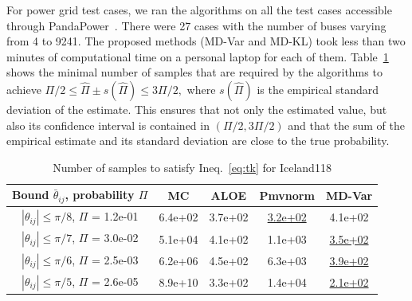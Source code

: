 For power grid test cases, we ran the algorithms on all the test cases accessible through PandaPower~\cite{pandapower.2018}. There were 27 cases with the number of buses varying from 4 to 9241. The proposed methods (MD-Var and MD-KL) took less than two minutes of computational time on a personal laptop for each of them. 
%
Table~\ref{tab:sample-compX} shows the minimal number of samples that are required by the algorithms to achieve $\Pi/2 \le \hat\Pi \pm s(\hat\Pi) \le 3\Pi/2, \label{eq:tk}$
where $s(\hat\Pi)$ is the empirical standard deviation of the estimate. This ensures that not only the estimated value, but also its confidence interval is contained in $(\Pi/2, 3\Pi/2)$ and that the sum of the empirical estimate and its standard deviation are close to %
the true probability. 


\begin{table}[ht]
\centering
\captionsetup{justification=centering}
\caption{Number of samples to satisfy Ineq.~\eqref{eq:tk} 
 for Iceland118}
 \begin{tabular}{c|c|c|c|c} 
 \hspace{-2mm}Bound ${\bar\theta}_{ij}$, probability $\Pi$ & MC & ALOE & Pmvnorm & MD-Var\\
 \hline
  \hspace{-2mm}$|{\theta}_{ij}| \le \pi/8$, $\Pi$ = 1.2e-01 & 6.4e+02 & 3.7e+02 & \underline{3.2e+02} & 4.1e+02\\
  \hspace{-2mm}$|{\theta}_{ij}| \le \pi/7$, $\Pi$ = 3.0e-02 & 5.1e+04 & 4.1e+02 & 1.1e+03 & \underline{3.5e+02}\\
  \hspace{-2mm}$|{\theta}_{ij}| \le \pi/6$, $\Pi$ = 2.5e-03  & 6.2e+06 & 4.5e+02 & 6.3e+03 & \underline{3.9e+02} \\
  \hspace{-2mm}$|{\theta}_{ij}| \le \pi/5$, $\Pi$ = 2.6e-05  & 8.9e+10 & 3.3e+02 & 1.4e+04 & \underline{2.1e+02}\\
 \end{tabular}
 \vspace{-0mm}\label{tab:sample-compX}
\end{table}




